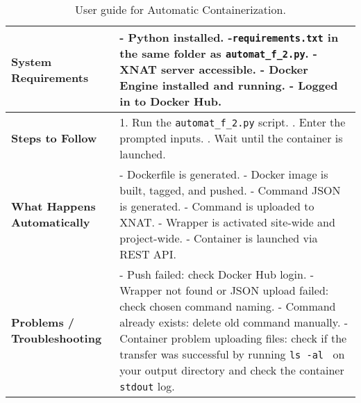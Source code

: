 \begin{table}[H]
  \centering
  \caption{ User guide for Automatic Containerization.}
  \label{tab:automatic_script}
  \begin{tabular}{|l|p{9cm}|}
  \hline
  \textbf{System Requirements} & 
  - Python installed. \newline
  -\texttt{requirements.txt} in the same folder as \texttt{automat\_f\_2.py}. \newline
  - XNAT server accessible. \newline
  - Docker Engine installed and running. \newline
  - Logged in to Docker Hub. \\  \hline
  \textbf{Steps to Follow} & 
  1. Run the \texttt{automat\_f\_2.py} script. \newline
  2. Enter the prompted inputs. \newline
  3. Wait until the container is launched. \\
  \hline
  \textbf{What Happens Automatically} & 
  - Dockerfile is generated. \newline
  - Docker image is built, tagged, and pushed. \newline
  - Command JSON is generated. \newline
  - Command is uploaded to XNAT. \newline
  - Wrapper is activated site-wide and project-wide. \newline
  - Container is launched via REST API. \\
  \hline
  \textbf{Problems / Troubleshooting} & 
  - Push failed: check Docker Hub login. \newline
  - Wrapper not found or JSON upload failed: check chosen command naming. \newline
  - Command already exists: delete old command manually. \newline
  - Container problem uploading files: check if the transfer was successful by running \texttt{ls -al \*} on your output directory and check the container \texttt{stdout} log. \\
  \hline
  \end{tabular}
\end{table}


\normalsize
